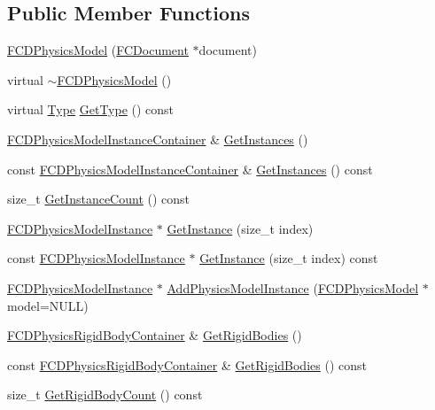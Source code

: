 \subsection*{Public Member Functions}
\begin{DoxyCompactItemize}
\item 
\hyperlink{classFCDPhysicsModel_a4cdcfff220f1071c13f8141ba715d193}{FCDPhysicsModel} (\hyperlink{classFCDocument}{FCDocument} $\ast$document)
\item 
virtual \hyperlink{classFCDPhysicsModel_ae1527f7869220fe0d1a6340af40a6c57}{$\sim$FCDPhysicsModel} ()
\item 
virtual \hyperlink{classFCDEntity_a9301a4bd5f4d4190ec13e40db4effdd7}{Type} \hyperlink{classFCDPhysicsModel_a3da8c015b13e7225d2416c102333fe4b}{GetType} () const 
\item 
\hyperlink{classFUObjectContainer}{FCDPhysicsModelInstanceContainer} \& \hyperlink{classFCDPhysicsModel_a9d4c1eea1be92761c5b7c8a546bc8579}{GetInstances} ()
\item 
const \hyperlink{classFUObjectContainer}{FCDPhysicsModelInstanceContainer} \& \hyperlink{classFCDPhysicsModel_a2d02738090b8d06a014b4b30b128e8a2}{GetInstances} () const 
\item 
size\_\-t \hyperlink{classFCDPhysicsModel_ac2144145ba0118b5a937b3a1d681269f}{GetInstanceCount} () const 
\item 
\hyperlink{classFCDPhysicsModelInstance}{FCDPhysicsModelInstance} $\ast$ \hyperlink{classFCDPhysicsModel_a1e94dffa1c9c1e88d30f407d0e3aae71}{GetInstance} (size\_\-t index)
\item 
const \hyperlink{classFCDPhysicsModelInstance}{FCDPhysicsModelInstance} $\ast$ \hyperlink{classFCDPhysicsModel_a7966d893455aaa403472fce13bbb5a0d}{GetInstance} (size\_\-t index) const 
\item 
\hyperlink{classFCDPhysicsModelInstance}{FCDPhysicsModelInstance} $\ast$ \hyperlink{classFCDPhysicsModel_ae222e53d9c0c9a2e7573d0350475b247}{AddPhysicsModelInstance} (\hyperlink{classFCDPhysicsModel}{FCDPhysicsModel} $\ast$model=NULL)
\item 
\hyperlink{classFUObjectContainer}{FCDPhysicsRigidBodyContainer} \& \hyperlink{classFCDPhysicsModel_ae20872b9a7123fe0249229744c61e372}{GetRigidBodies} ()
\item 
const \hyperlink{classFUObjectContainer}{FCDPhysicsRigidBodyContainer} \& \hyperlink{classFCDPhysicsModel_a66b28ef11ddd98c22cf9d3a0cbcb2208}{GetRigidBodies} () const 
\item 
size\_\-t \hyperlink{classFCDPhysicsModel_ab78fe671de0d7fc3aa95696f7b0d733f}{GetRigidBodyCount} () const 

\end{DoxyCompactItemize}
